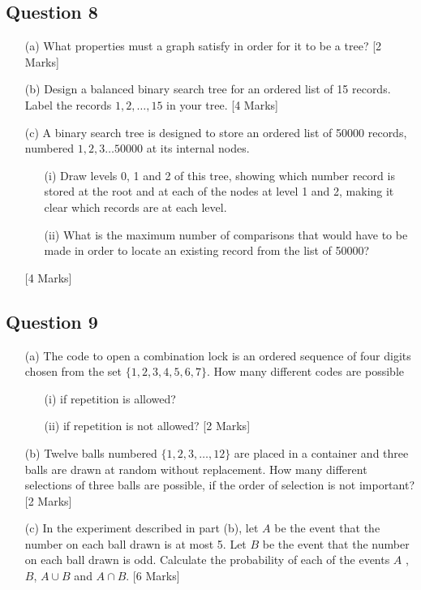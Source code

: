 \documentclass[a4paper,12pt]{article}
\begin{document}
\subsection*{Question 8}
\begin{itemize}

\item[(a)] What properties must a graph satisfy in order for it to be a tree? [2 Marks]
\item[(b)] Design a balanced binary search tree for an ordered list of 15 records.
Label the records $1,2, \ldots , 15$ in your tree. [4 Marks]

\item[(c)] A binary search tree is designed to store an ordered list of 50000 records,
numbered $1,2,3\ldots 50000$ at its internal nodes.
\begin{itemize}
\item[(i)] Draw levels 0, 1 and 2 of this tree, showing which number record is stored
at the root and at each of the nodes at level 1 and 2, making it clear
which records are at each level.
\item[(ii)] What is the maximum number of comparisons that would have to be
made in order to locate an existing record from the list of 50000? 
\end{itemize}
[4 Marks]
\end{itemize}

\newpage
\subsection*{Question 9} %

\begin{itemize}
\item[(a)] The code to open a combination lock is an ordered sequence of four digits
chosen from the set $\{1, 2, 3, 4, 5, 6, 7\}$. How many different codes are possible
\begin{itemize}
\item[(i)] if repetition is allowed?
\item[(ii)]  if repetition is not allowed? [2 Marks]
\end{itemize}
\item[(b)] Twelve balls numbered $\{1,2,3, \ldots ,12\}$ are placed in a container and three balls
are drawn at random without replacement. How many different selections of
three balls are possible, if the order of selection is not important? [2 Marks]
\item[(c)] In the experiment described in part (b), let $A$ be the event that the number on
each ball drawn is at most 5. Let $B$ be the event that the number on each ball
drawn is odd. Calculate the probability of each of the events $A$ , $B$, $A \cup B$ and $A \cap B$. [6 Marks]
\end{itemize}
\end{document}
